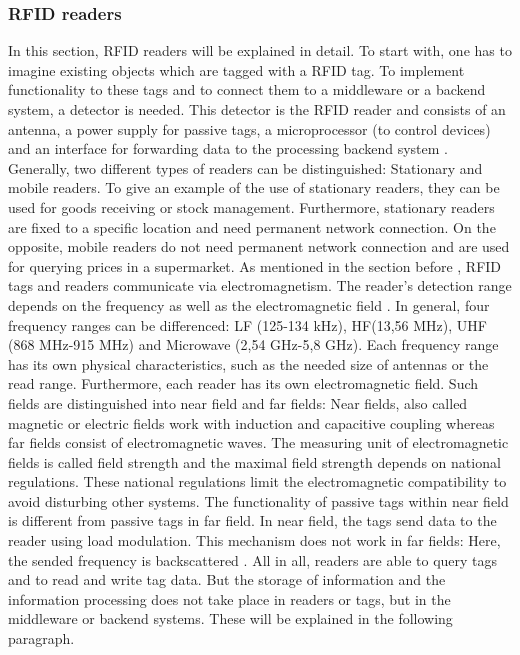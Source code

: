 \subsubsection{RFID readers} \label{reader}

In this section, RFID readers will be explained in detail. To start with, one has to imagine existing objects which are tagged with a RFID tag. To implement functionality to these tags and to connect them to a middleware or a backend system, a detector is needed. This detector is the RFID reader and consists of an antenna, a power supply for passive tags, a microprocessor (to control devices) and an interface for forwarding data to the processing backend system \cite{henrici}. 
Generally, two different types of readers can be distinguished: Stationary and mobile readers. To give an example of the use of stationary readers, they can be used for goods receiving or stock management. Furthermore, stationary readers are fixed to a specific location and need permanent network connection. On the opposite, mobile readers do not need permanent network connection and are used for querying prices in a supermarket.
As mentioned in the section before \pageref{tags}, RFID tags and readers communicate via electromagnetism. The reader's detection range depends on the frequency as well as the electromagnetic field \cite{henrici}. In general, four frequency ranges can be differenced: \ac{LF} (125-134 kHz), \ac{HF}(13,56 MHz), \ac{UHF} (868 MHz-915 MHz) and Microwave (2,54 GHz-5,8 GHz). Each frequency range has its own physical characteristics, such as the needed size of antennas or the read range. Furthermore, each reader has its own electromagnetic field. Such fields are distinguished into near field and far fields: Near fields, also called magnetic or electric fields work with induction and capacitive coupling whereas far fields consist of electromagnetic waves. The measuring unit of electromagnetic fields is called field strength and the maximal field strength depends on national regulations. These national regulations limit the electromagnetic compatibility to avoid disturbing other systems. The functionality of passive tags within near field is different from passive tags in far field. In near field, the tags send data to the reader using load modulation. This mechanism does not work in far fields: Here, the sended frequency is backscattered \cite{henrici}.
All in all, readers are able to query tags and to read and write tag data. But the storage of information and the information processing does not take place in readers or tags, but in the middleware or backend systems. These will be explained in the following paragraph.

